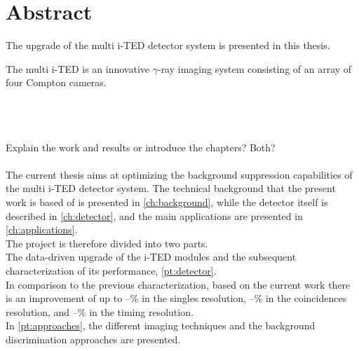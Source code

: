 \begingroup
\let\clearpage\relax
\let\cleardoublepage\relax
\let\cleardoublepage\relax

\chapter*{Abstract}

The upgrade of the multi \ac{i-TED} detector system is presented in this thesis.

The multi \ac{i-TED} is an innovative $\gamma$-ray imaging system consisting of an array of four Compton cameras.

\\~\\~\\

Explain the work and results or introduce the chapters? Both?\\~\\

The current thesis aims at optimizing the background suppression capabilities of the multi \ac{i-TED} detector system. The technical background that the present work is based of is presented in \ref{ch:background}, while the detector itself is described in \ref{ch:detector}, and the main applications are presented in \ref{ch:applications}.\\

The project is therefore divided into two parts.\\

The data-driven upgrade of the \ac{i-TED} modules and the subsequent characterization of its performance, \ref{pt:detector}.\\%
In comparison to the previous characterization, based on the current work there is an improvement of up to --\% in the singles resolution, --\% in the coincidences resolution, and --\% in the timing resolution.\\

In \ref{pt:approaches}, the different imaging techniques and the background discrimination approaches are presented.\\

\endgroup

\vfill

